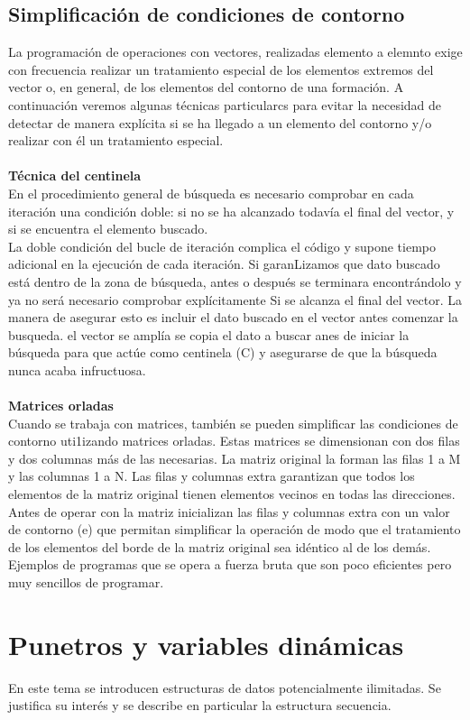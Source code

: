 \documentclass[11pt,a4paper]{article}
\begin{document}
  	\subsection{Simplificación de condiciones de contorno}
  	La programación de operaciones con vectores, realizadas elemento a elemnto exige con frecuencia realizar un tratamiento especial de los elementos extremos
  	del vector o, en general, de los elementos del contorno de una formación. A continuación veremos algunas técnicas particularcs para evitar la necesidad de detectar de manera explícita si se ha llegado a un elemento del contorno y/o
  	realizar con él un tratamiento especial.\\
  	\\
  	\textbf{Técnica del centinela}\\
  	En el procedimiento general de búsqueda es necesario comprobar en
  	cada iteración una condición doble: si no se ha alcanzado todavía el final del vector, y si se encuentra el elemento buscado.\\
  	La doble condición del bucle de iteración complica el código y supone
  	tiempo adicional en la ejecución de cada iteración. Si garanLizamos que
  	dato buscado está dentro de la zona de búsqueda, antes o después se terminara
  	encontrándolo y ya no será necesario comprobar explícitamente Si se alcanza el final del vector. La manera de asegurar esto es incluir el dato buscado en el vector antes comenzar la busqueda. el vector se amplía  se copia el dato a buscar anes de iniciar la búsqueda para que actúe como centinela (C) y asegurarse de que la búsqueda nunca acaba infructuosa.
  	\\
  	\\
  	\textbf{Matrices orladas}\\
  	Cuando se trabaja con matrices, también se pueden simplificar las condiciones
  	de contorno uti1izando matrices orladas. Estas matrices se dimensionan con
  	dos filas y dos columnas más de las necesarias. La matriz original la forman las filas 1 a M y las columnas 1 a N. Las filas y
  	columnas extra garantizan que todos los elementos de la matriz original tienen
  	elementos vecinos en todas las direcciones. Antes de operar con la matriz
  	inicializan las filas y columnas extra con un valor de contorno (e) que permitan simplificar la operación de modo que el tratamiento de los elementos del borde de la matriz original sea idéntico al de los demás. Ejemplos de programas que se opera a fuerza bruta que son poco eficientes pero muy sencillos de programar.
  	\section{Punetros y variables dinámicas}
  	En este tema se introducen estructuras de datos potencialmente ilimitadas.
  	Se justifica su interés y se describe en particular la estructura secuencia.
\end{document}
